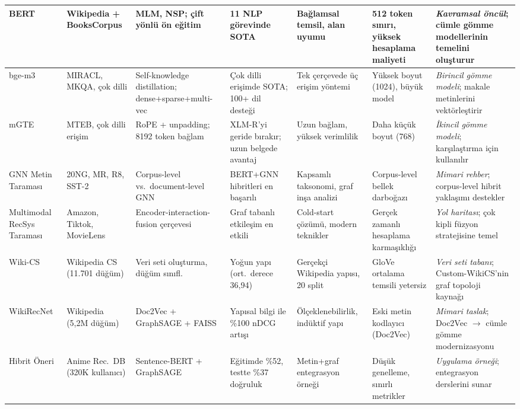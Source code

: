 \begin{landscape}
\begin{longtable}{|p{2.0cm}|p{2.0cm}|p{2.8cm}|p{3.5cm}|p{3.0cm}|p{3.0cm}|p{3.8cm}|}
BERT \cite{devlin2019bert} &
Wikipedia + BooksCorpus &
MLM, NSP; çift yönlü ön eğitim &
11 NLP görevinde SOTA &
Bağlamsal temsil, alan uyumu &
512 token sınırı, yüksek hesaplama maliyeti &
\textit{Kavramsal öncül}; cümle gömme modellerinin temelini oluşturur \\
\hline

bge-m3 \cite{chen2025bgem3} &
MIRACL, MKQA, çok dilli &
Self-knowledge distillation; dense+sparse+multi-vec &
Çok dilli erişimde SOTA; 100+ dil desteği &
Tek çerçevede üç erişim yöntemi &
Yüksek boyut (1024), büyük model &
\textit{Birincil gömme modeli}; makale metinlerini vektörleştirir \\
\hline

mGTE \cite{zhang2024mgte} &
MTEB, çok dilli erişim &
RoPE + unpadding; 8192 token bağlam &
XLM-R'yi geride bırakır; uzun belgede avantaj &
Uzun bağlam, yüksek verimlilik &
Daha küçük boyut (768) &
\textit{İkincil gömme modeli}; karşılaştırma için kullanılır \\
\hline

GNN Metin Taraması \cite{li2022graph} &
20NG, MR, R8, SST-2 &
Corpus-level vs.\ document-level GNN &
BERT+GNN hibritleri en başarılı &
Kapsamlı taksonomi, graf inşa analizi &
Corpus-level bellek darboğazı &
\textit{Mimari rehber}; corpus-level hibrit yaklaşımı destekler \\
\hline

Multimodal RecSys Taraması \cite{zhou2023multimodal} &
Amazon, Tiktok, MovieLens &
Encoder-interaction-fusion çerçevesi &
Graf tabanlı etkileşim en etkili &
Cold-start çözümü, modern teknikler &
Gerçek zamanlı hesaplama karmaşıklığı &
\textit{Yol haritası}; çok kipli füzyon stratejisine temel \\
\hline

Wiki-CS \cite{mernyei2020wikics} &
Wikipedia CS (11.701 düğüm) &
Veri seti oluşturma, düğüm sınıfl. &
Yoğun yapı (ort.\ derece 36,94) &
Gerçekçi Wikipedia yapısı, 20 split &
GloVe ortalama temsili yetersiz &
\textit{Veri seti tabanı}; Custom-WikiCS'nin graf topoloji kaynağı \\
\hline

WikiRecNet \cite{wikirecnet2020} &
Wikipedia (5,2M düğüm) &
Doc2Vec + GraphSAGE + FAISS &
Yapısal bilgi ile \%100 nDCG artışı &
Ölçeklenebilirlik, indüktif yapı &
Eski metin kodlayıcı (Doc2Vec) &
\textit{Mimari taslak}; Doc2Vec $\to$ cümle gömme modernizasyonu \\
\hline

Hibrit Öneri \cite{anime_hybrid_gnn_bert} &
Anime Rec.\ DB (320K kullanıcı) &
Sentence-BERT + GraphSAGE &
Eğitimde \%52, testte \%37 doğruluk &
Metin+graf entegrasyon örneği &
Düşük genelleme, sınırlı metrikler &
\textit{Uygulama örneği}; entegrasyon derslerini sunar \\
\hline

\end{longtable}
\end{landscape}